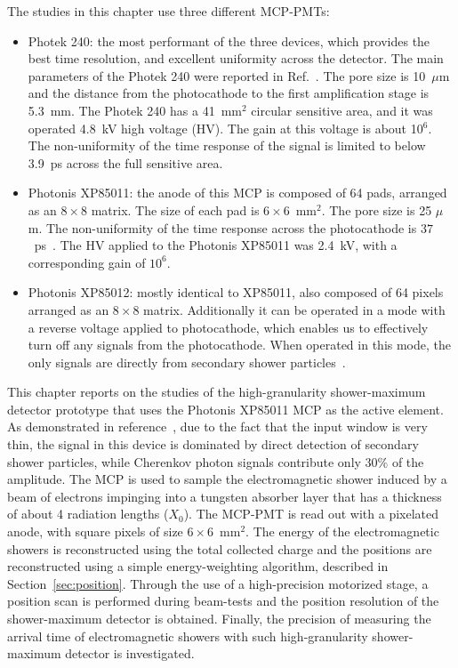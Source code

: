 The studies in this chapter use three different MCP-PMTs:
\begin{itemize}
\item Photek 240: the most performant of the three devices, which provides the best
      time resolution, and excellent uniformity across the detector. The main parameters
      of the Photek 240 were reported in Ref.~\cite{MCPFastCaloNIMA}. The pore
      size is 10~$\mu$m and the distance from the photocathode to the first
      amplification stage is 5.3~mm. The Photek 240 has a 41~mm$^2$ circular
      sensitive area, and it was operated 4.8~kV high voltage (HV). The gain at
      this voltage is about 10$^6$. The non-uniformity of the time response of the signal 
      is limited to below 3.9~ps across the full sensitive area.
\item Photonis XP85011: the anode of this MCP is composed of 64 pads, arranged
      as an $8\times8$ matrix. The size of each pad is $6\times6$~$\mathrm{mm}^{2}$. 
      The pore size is 25 $\mu$m. The non-uniformity  of the time response across the photocathode
      is $37$~ps~\cite{MCPFastCaloNIMA, Ronzhin2015288}. The HV applied to the Photonis XP85011 
      was 2.4~kV, with a corresponding gain of $10^6$. 
\item Photonis XP85012: mostly identical to XP85011, also composed of 64 pixels arranged as
      an $8\times8$ matrix. Additionally it can be operated in a mode with a reverse voltage applied 
      to photocathode, which enables us to effectively turn off any signals from 
      the photocathode. When operated in this mode, the only signals are 
      directly from secondary shower particles~\cite{Ronzhin:2015pba}.  
\end{itemize}

This chapter reports on the studies of the high-granularity shower-maximum detector prototype 
that uses the Photonis XP85011 MCP as the active element. As demonstrated in 
reference~\cite{MCPFastCaloNIMA}, due to the fact that the input window is very thin, the signal in this device is dominated by direct detection of secondary shower particles, 
while Cherenkov photon signals contribute only $30\%$ of the amplitude.
The MCP is used to sample the electromagnetic shower induced by a beam
of electrons impinging into a tungsten absorber layer that has a thickness of about 4 radiation lengths ($X_{0}$). The
MCP-PMT is read out with a pixelated anode, with square pixels of size 
$6\times6$~$\mathrm{mm}^{2}$. The energy of the electromagnetic showers is reconstructed 
using the total collected charge and the positions are reconstructed using a simple
energy-weighting algorithm, described in Section~\ref{sec:position}.
Through the use of a high-precision motorized stage, a position scan is
performed during beam-tests and the position resolution of the shower-maximum
detector is obtained. Finally, the precision of measuring the
arrival time of electromagnetic showers with such high-granularity shower-maximum
detector is investigated.

